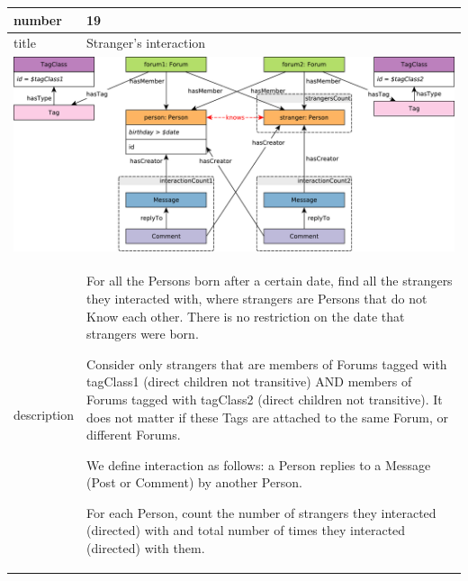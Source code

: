 \renewcommand*{\arraystretch}{1.1}

\noindent\begin{tabularx}{17cm}{|p{1.95cm}|X|}
	\hline
	number      & 19                                                          \\ \hline
%
	title       & Stranger's interaction                                                           \\ \hline
	\multicolumn{2}{|c|}{ \includegraphics[scale=\patternscale,margin=0cm .2cm]{patterns/q19}} \\ \hline
	description & For all the Persons born after a certain date, find all the strangers
they interacted with, where strangers are Persons that do not Know each
other. There is no restriction on the date that strangers were born.

Consider only strangers that are members of Forums tagged with tagClass1
(direct children not transitive) AND members of Forums tagged with
tagClass2 (direct children not transitive). It does not matter if these
Tags are attached to the same Forum, or different Forums.

We define interaction as follows: a Person replies to a Message (Post or
Comment) by another Person.

For each Person, count the number of strangers they interacted
(directed) with and total number of times they interacted (directed)
with them.
 \\ \hline
	

\end{tabularx}
